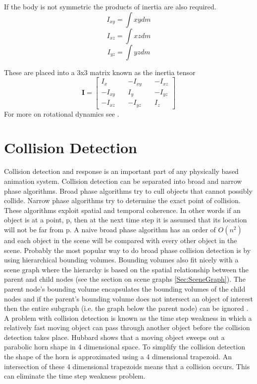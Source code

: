 If the body is not symmetric the products of inertia are also required.
\[
I_{xy} = \int xy dm
\]
\[
I_{xz} = \int xz dm
\]
\[
I_{yz} = \int yz dm
\]

These are placed into a 3x3 matrix known as the inertia tensor
\[
\mathbf{I} = 
\begin{bmatrix}
	I_x &\:& -I_{xy} &\:& -I_{xz} \\
	-I_{xy} &\:& I_{y} &\:& -I_{yz} \\
	-I_{xz} &\:& -I_{yz} &\:& I_{z}
\end{bmatrix}
\]
For more on rotational dynamics see \cite{Otte, Goldstein, Watt}.

\section{Collision Detection} 
\label{Sec:CollisionDetection} 
Collision detection and response is an important part of any physically based
animation system.  Collision detection can be separated into broad and narrow
phase algorithms.  Broad phase algorithms try to cull objects that cannot
possibly collide. Narrow phase algorithms try to determine the exact point of
collision.  These algorithms exploit spatial and temporal coherence. In other
words if an object is at a point, p, then at the next time step it is assumed
that its location will not be far from p. A naive broad phase algorithm has an
order of $O(n^2)$ and each object in the scene will be compared with every other
object in the scene. Probably the most popular way to do broad phase collision
detection is by using hierarchical bounding volumes. Bounding volumes also fit
nicely with a scene graph where the hierarchy is based on the spatial
relationship between the parent and child nodes (see the section on scene graphs
\ref{Sec:SceneGraph}).  The parent node's bounding volume encapsulates the
bounding volumes of the child nodes and if the parent's bounding volume does not
intersect an object of interest then the entire subgraph (i.e. the graph below
the parent node) can be ignored \cite{Eberly}. A problem with collision
detection is known as the time step weakness in which a relatively fast moving
object can pass through another object before the collision detection takes
place. Hubbard \cite{InteractiveColDet} shows that a moving object sweeps out a
parabolic horn shape in 4 dimensional space. To simplify the collision detection
the shape of the horn is approximated using a 4 dimensional trapezoid. An
intersection of these 4 dimensional trapezoids means that a collision 
occurs. This can eliminate the time step weakness problem.

